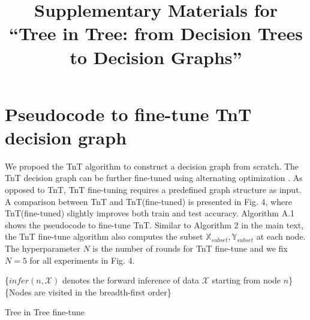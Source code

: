 \documentclass{article}
\title{Supplementary Materials for\\ ``Tree in Tree: from Decision Trees to Decision Graphs''}
\begin{document}
\maketitle
\appendix
{}

\section{Pseudocode to fine-tune TnT decision graph}
We propoed the TnT algorithm to construct a decision graph from scratch. The TnT decision graph can be further fine-tuned using alternating optimization \cite{carreira2018alternating}. As opposed to TnT, TnT fine-tuning requires a predefined graph structure as input. A comparison between TnT and TnT(fine-tuned) is presented in Fig. 4, where TnT(fine-tuned) slightly improves both train and test accuracy. Algorithm A.1 shows the pseudocode to fine-tune TnT. Similar to Algorithm 2 in the main text, the TnT fine-tune algorithm also computes the subset $\mathbb{X}_{subset}, \mathbb{Y}_{subset}$ at each node. The hyperparameter $N$ is the number of rounds for TnT fine-tune and we fix $N=5$ for all experiments in Fig. 4.

\begin{algorithm}[H]
  \SetAlgoLined
  \{$infer(n, \mathcal{X})$ denotes the forward inference of data $\mathcal{X}$ starting from node $n$\}\; 
  \{Nodes are visited in the breadth-first order\}\;
  \label{algorithm2}
  \caption{Tree in Tree fine-tune}
\end{algorithm}
\end{document}
